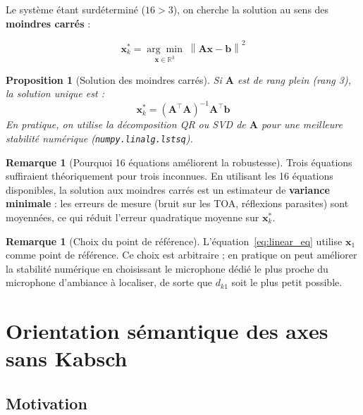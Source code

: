 \documentclass[12pt, a4paper]{article}
\theoremstyle{plain}
\newtheorem{proposition}[theorem]{Proposition}
\theoremstyle{definition}
\newtheorem{remark}[theorem]{Remarque}
\newcommand{\R}{\mathbb{R}}
\newcommand{\norm}[1]{\left\lVert #1 \right\rVert}
\newcommand{\mat}[1]{\mathbf{#1}}
\newcommand{\vect}[1]{\mathbf{#1}}
\begin{document}
Le système étant surdéterminé ($16 > 3$), on cherche la solution au sens des
\textbf{moindres carrés} :

\begin{equation}
    \boxed{\vect{x}_k^* = \underset{\vect{x} \in \R^3}{\arg\min}\;
    \norm{\mat{A}\vect{x} - \vect{b}}^2}
    \label{eq:lstsq}
\end{equation}

\begin{proposition}[Solution des moindres carrés]
    Si $\mat{A}$ est de rang plein (rang 3), la solution unique est :
    \begin{equation}
        \vect{x}_k^* = (\mat{A}^\top\mat{A})^{-1}\mat{A}^\top\vect{b}
    \end{equation}
    En pratique, on utilise la décomposition QR ou SVD de $\mat{A}$ pour
    une meilleure stabilité numérique (\texttt{numpy.linalg.lstsq}).
\end{proposition}

\begin{remark}[Pourquoi 16 équations améliorent la robustesse]
    Trois équations suffiraient théoriquement pour trois inconnues. En
    utilisant les 16 équations disponibles, la solution aux moindres carrés
    est un estimateur de \textbf{variance minimale} : les erreurs de mesure
    (bruit sur les TOA, réflexions parasites) sont moyennées, ce qui réduit
    l'erreur quadratique moyenne sur $\vect{x}_k^*$.
\end{remark}

\begin{remark}[Choix du point de référence]
    L'équation~\eqref{eq:linear_eq} utilise $\vect{x}_1$ comme point de
    référence. Ce choix est arbitraire ; en pratique on peut améliorer la
    stabilité numérique en choisissant le microphone dédié le plus proche du
    microphone d'ambiance à localiser, de sorte que $d_{k1}$ soit le plus
    petit possible.
\end{remark}

\section{Orientation sémantique des axes sans Kabsch}
\label{sec:orientation}

\subsection{Motivation}
\end{document}
